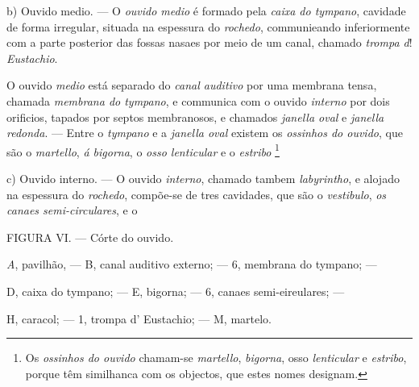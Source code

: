 b) Ouvido medio. --- O \emph{ouvido medio} é formado pela \emph{caixa do tympano}, cavidade de forma irregular, situada na espessura do \emph{rochedo}, communieando inferiormente com a parte posterior das fossas nasaes por meio de um canal, chamado \emph{trompa d}! \emph{Eustachio}.

O ouvido \emph{medio} está separado do \emph{canal auditivo} por uma membrana tensa, chamada \emph{membrana do tympano}, e communica com o ouvido \emph{interno} por dois orificios, tapados por septos membranosos, e chamados \emph{janella oval} e \emph{janella redonda}. --- Entre o \emph{tympano} e a \emph{janella oval} existem os \emph{ossinhos do ouvido}, que são o \emph{martello}, \emph{á bigorna}, o \emph{osso lenticular} e o \emph{estribo} \footnote{Os \emph{ossinhos do ouvido} chamam-se \emph{martello}, \emph{bigorna}, osso \emph{lenticular} e \emph{estribo}, porque têm similhanca com os objectos, que estes nomes designam.}

c) Ouvido interno. --- O ouvido \emph{interno}, chamado tambem \emph{labyrintho}, e alojado na espessura do \emph{rochedo}, compõe-se de tres cavidades, que são o \emph{vestibulo}, \emph{os canaes semi-circulares}, e o

FIGURA VI. --- Córte do ouvido.

\emph{A}, pavilhão, --- B, canal auditivo externo; --- 6, membrana do tympano; ---

D, caixa do tympano; --- E, bigorna; --- 6, canaes semi-eireulares; ---

H, caracol; --- 1, trompa d' Eustachio; --- M, martelo.

